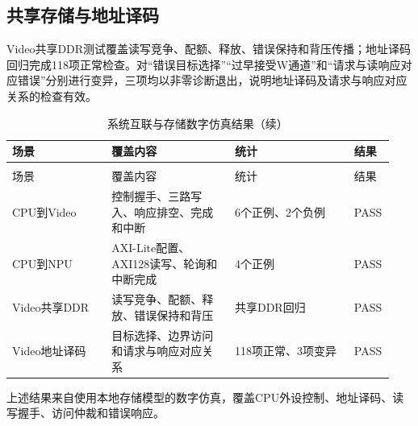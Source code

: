 \subsection{共享存储与地址译码}

Video共享DDR测试覆盖读写竞争、配额、释放、错误保持和背压传播；地址译码回归完成118项正常检查。对“错误目标选择”“过早接受W通道”和“请求与读响应对应错误”分别进行变异，三项均以非零诊断退出，说明地址译码及请求与响应对应关系的检查有效。

\begin{reporttable}
\begin{longtable}{@{}p{0.25\linewidth}p{0.31\linewidth}p{0.30\linewidth}p{0.08\linewidth}@{}}
\caption{系统互联与存储数字仿真结果}\\
\toprule
场景 & 覆盖内容 & 统计 & 结果 \\
\midrule
\endfirsthead
\caption[]{系统互联与存储数字仿真结果（续）}\\
\toprule
场景 & 覆盖内容 & 统计 & 结果 \\
\midrule
\endhead
\bottomrule
\endfoot
CPU到Video & 控制握手、三路写入、响应排空、完成和中断 & 6个正例、2个负例 & PASS \\
CPU到NPU & AXI-Lite配置、AXI128读写、轮询和中断完成 & 4个正例 & PASS \\
Video共享DDR & 读写竞争、配额、释放、错误保持和背压 & 共享DDR回归 & PASS \\
Video地址译码 & 目标选择、边界访问和请求与响应对应关系 & 118项正常、3项变异 & PASS \\
\end{longtable}
\end{reporttable}

上述结果来自使用本地存储模型的数字仿真，覆盖CPU外设控制、地址译码、读写握手、访问仲裁和错误响应。

